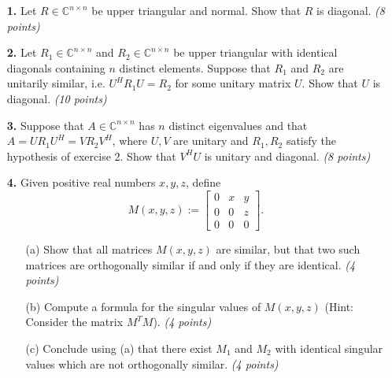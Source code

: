 \documentclass[14pt]{report}
\begin{document}
\begin{enumerate}
  \item[\textbf{1.}] Let $R\in\mathbb{C}^{n\times n}$ be upper triangular and normal. Show that $R$ is  diagonal. \textit{(8 points)}


\vspace{1cm}



  \item[\textbf{2.}] Let $R_1\in\mathbb{C}^{n\times n}$ and
    $R_2\in\mathbb{C}^{n\times n}$ be upper triangular with identical diagonals
    containing $n$ distinct elements. Suppose that $R_1$ and $R_2$ are 
    unitarily similar, i.e. $U^HR_1U = R_2$ for some unitary matrix $U$.
    Show that $U$ is diagonal. \textit{(10 points)}



\vspace{1cm}

  \item[\textbf{3.}] Suppose that $A \in \mathbb{C}^{n \times n}$ has $n$ distinct eigenvalues and
    that $A = U R_1 U^H = V R_2 V^H$, where $U,V$ are unitary and $R_1, R_2$ satisfy the hypothesis of exercise 2. Show that $V^H U$ is unitary and
    diagonal. \textit{(8 points)}


\vspace{1cm}


  \item[\textbf{4.}] Given positive real numbers $x,y,z$, define   \[M(x,y,z):=\left[\begin{array}{ccc}0&x&y\\0&0&z\\0&0&0\end{array}\right].\]
    \begin{enumerate}
      \item[(a)] Show that all matrices $M(x,y,z)$ are similar, but that two
         such matrices are orthogonally similar if and only if they are identical. \textit{(4 points)}

      \item[(b)] Compute a formula for the singular values of $M(x,y,z)$ (Hint: Consider the matrix $M^T M$). \linebreak\textit{(4 points)}
      \item[(c)] Conclude using (a) that there exist $M_1$ and $M_2$ with
        identical singular values which are not orthogonally similar. \textit{(4 points)} 
      \end{enumerate}
 

\end{enumerate}
\end{document}
